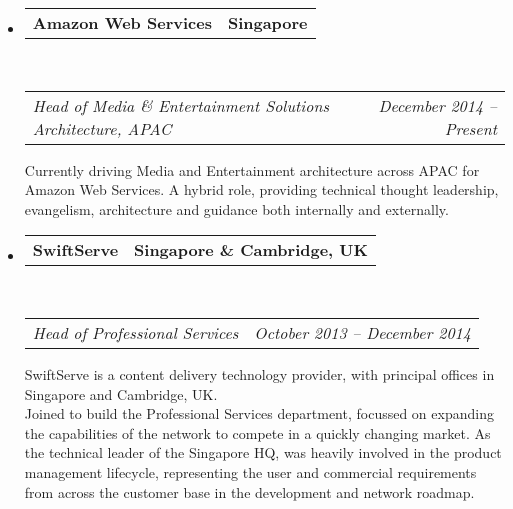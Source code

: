 \documentclass[10pt,a4paper]{article}
\makeatletter
\newcommand{\headerrow}[2]
{\begin{tabular*}{\linewidth}{l@{\extracolsep{\fill}}r}
    #1 &
    #2 \\
\end{tabular*}}
\makeatother
\begin{document}
\begin{itemize}
    \parskip=0.1em

    \item
        \headerrow
            {\textbf{Amazon Web Services}}
            {\textbf{Singapore}}
        \\
        \headerrow
            {\emph{Head of Media \& Entertainment Solutions Architecture, APAC}}
            {\emph{December 2014 -- Present}}
            
            Currently driving Media and Entertainment architecture across APAC for Amazon Web Services. A hybrid role, providing technical thought leadership, evangelism, architecture and guidance both internally and externally.  
            


    \item
        \headerrow
            {\textbf{SwiftServe}}
            {\textbf{Singapore \& Cambridge, UK}}
        \\
        \headerrow
            {\emph{Head of Professional Services}}
            {\emph{October 2013 -- December 2014}}
    
            SwiftServe is a content delivery technology provider, with principal offices in Singapore and Cambridge, UK.
            \\
            Joined to build the Professional Services department, focussed on expanding the capabilities of the network to compete in a quickly changing market. As the technical leader of the Singapore HQ, was heavily involved in the product management lifecycle, representing the user and commercial requirements from across the customer base in the development and network roadmap.
            

\end{itemize}
\end{document}
